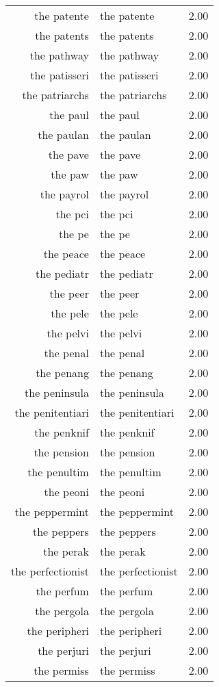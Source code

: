 \begin{table}[ht]
\begin{tabular}{rlr}
  the patente & the patente & 2.00 \\ 
  the patents & the patents & 2.00 \\ 
  the pathway & the pathway & 2.00 \\ 
  the patisseri & the patisseri & 2.00 \\ 
  the patriarchs & the patriarchs & 2.00 \\ 
  the paul & the paul & 2.00 \\ 
  the paulan & the paulan & 2.00 \\ 
  the pave & the pave & 2.00 \\ 
  the paw & the paw & 2.00 \\ 
  the payrol & the payrol & 2.00 \\ 
  the pci & the pci & 2.00 \\ 
  the pe & the pe & 2.00 \\ 
  the peace & the peace & 2.00 \\ 
  the pediatr & the pediatr & 2.00 \\ 
  the peer & the peer & 2.00 \\ 
  the pele & the pele & 2.00 \\ 
  the pelvi & the pelvi & 2.00 \\ 
  the penal & the penal & 2.00 \\ 
  the penang & the penang & 2.00 \\ 
  the peninsula & the peninsula & 2.00 \\ 
  the penitentiari & the penitentiari & 2.00 \\ 
  the penknif & the penknif & 2.00 \\ 
  the pension & the pension & 2.00 \\ 
  the penultim & the penultim & 2.00 \\ 
  the peoni & the peoni & 2.00 \\ 
  the peppermint & the peppermint & 2.00 \\ 
  the peppers & the peppers & 2.00 \\ 
  the perak & the perak & 2.00 \\ 
  the perfectionist & the perfectionist & 2.00 \\ 
  the perfum & the perfum & 2.00 \\ 
  the pergola & the pergola & 2.00 \\ 
  the peripheri & the peripheri & 2.00 \\ 
  the perjuri & the perjuri & 2.00 \\ 
  the permiss & the permiss & 2.00 \\ 

\end{tabular}
\end{table}
